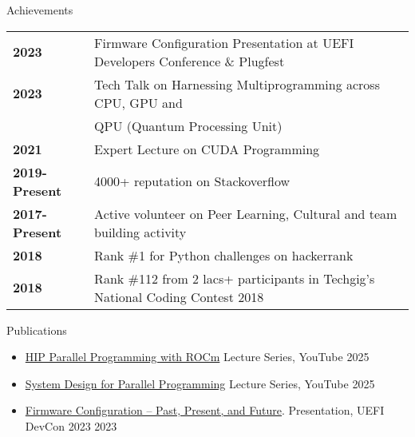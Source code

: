 \documentclass{resume} %
\begin{document}
\begin{rSection}{Achievements}

\begin{tabular}{ @{} >{\bfseries}l @{\hspace{6ex}} l }
2023 & Firmware Configuration Presentation at UEFI Developers Conference \& Plugfest \\
2023 & Tech Talk on Harnessing Multiprogramming across CPU, GPU and 
\\ & QPU (Quantum Processing Unit) \\
2021 & Expert Lecture on CUDA Programming \\
2019-Present & 4000+ reputation on Stackoverflow \\
2017-Present & Active volunteer on Peer Learning, Cultural and team building activity \\
2018 & Rank \#1 for Python challenges on hackerrank \\
2018 & Rank \#112 from 2 lacs+ participants in Techgig's National Coding Contest 2018 \\

\end{tabular}

\end{rSection}


\begin{rSection}{Publications}

\begin{itemize}
    \item \href{https://youtube.com/playlist?list=PLWyBQeJgIuzDFELUK9ineNkOr9LuYatkR&si=mUVeIkLFK5gzyZa7}{HIP Parallel Programming with ROCm} Lecture Series, YouTube  \hfill {2025}
    \item \href{https://www.youtube.com/playlist?list=PLWyBQeJgIuzD2o9ZVw5oI-P2fX4uyNKZA}{System Design for Parallel Programming} Lecture Series, YouTube  \hfill {2025}
    \item \href{https://uefi.org/sites/default/files/resources/Firmware%20Configuration%20%E2%80%93%20Past%2C%20Present%2C%20and%20Future_Zimmer.pdf}{Firmware Configuration – Past, Present, and Future}. Presentation, UEFI DevCon 2023 \hfill {2023}
\end{itemize}


\end{rSection}
\end{document}
